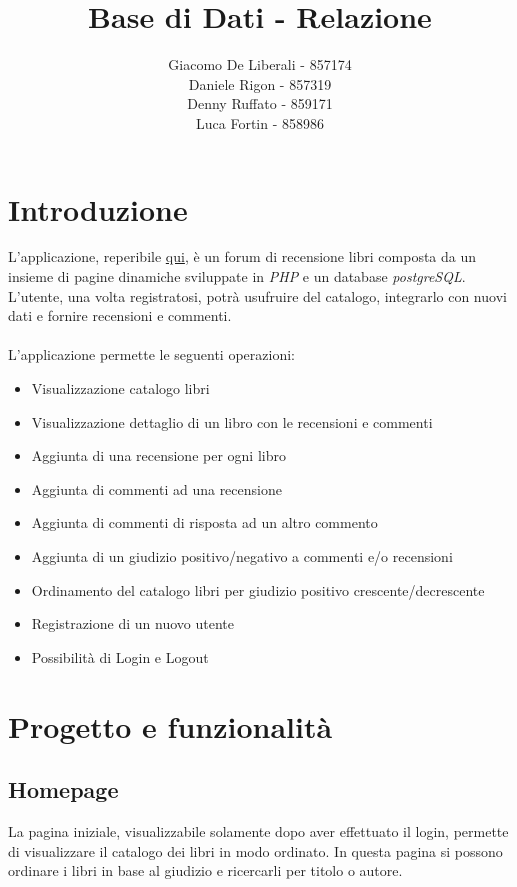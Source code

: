\documentclass[italian]{article}
\author{
	Giacomo De Liberali - 857174\\
	Daniele Rigon - 857319 \\
	Denny Ruffato - 859171 \\
	Luca Fortin - 858986
}
\begin{document}
	
\title{Base di Dati - Relazione}
\maketitle

\tableofcontents
\pagebreak

\section{Introduzione}
L’applicazione, reperibile \href{http://wwwstud.dsi.unive.it/gdeliber/bd2017/}{qui}, è un forum di recensione libri composta da un insieme di pagine dinamiche sviluppate in \textit{PHP} e un database \textit{postgreSQL}. L'utente, una volta registratosi, potrà usufruire del catalogo, integrarlo con nuovi dati e fornire recensioni e commenti. \\\\

\noindent
L'applicazione permette le seguenti operazioni:
\begin{itemize}
	\item Visualizzazione catalogo libri
	\item Visualizzazione dettaglio di un libro con le recensioni e commenti
	\item Aggiunta di una recensione per ogni libro
	\item Aggiunta di commenti ad una recensione
	\item Aggiunta di commenti di risposta ad un altro commento
	\item Aggiunta di un giudizio positivo/negativo a commenti e/o recensioni
	\item Ordinamento del catalogo libri per giudizio positivo crescente/decrescente
	\item Registrazione di un nuovo utente
	\item Possibilità di Login e Logout
\end{itemize}
\section{Progetto e funzionalità}
\subsection{Homepage}
La pagina iniziale, visualizzabile solamente dopo aver effettuato il login, permette di visualizzare il catalogo dei libri in modo ordinato.
In questa pagina si possono ordinare i libri in base al giudizio e ricercarli per titolo o autore.
\end{document}
